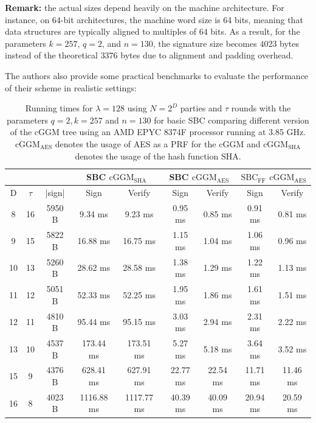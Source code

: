 \documentclass[english]{article}
\begin{document}
		\textbf{Remark:} the actual sizes depend heavily on the machine architecture. For instance, on 64-bit architectures, the machine word size is 64 bits, meaning that data structures are typically aligned to multiples of 64 bits. As a result, for the parameters $k = 257$, $q = 2$, and $n = 130$, the signature size becomes $4023$ bytes instead of the theoretical $3376$ bytes due to alignment and padding overhead.
		
		The authors also provide some practical benchmarks to evaluate the performance of their scheme in realistic settings:
		
		\begin{table}[h!]
			\begin{center}
				\begin{tabular}{|c|c|c||c|c||c|c||c|c|}
					\hline
					\multicolumn{3}{|c||}{} &  \multicolumn{2}{c||}{SBC $\text{cGGM}_{\text{SHA}}$} & \multicolumn{2}{c||}{SBC $\text{cGGM}_{\text{AES}}$} & \multicolumn{2}{c|}{$\text{SBC}_{\text{FF}}$ $\text{cGGM}_{\text{AES}}$} \\
					\hline
					D & $\tau$ & |sign| & Sign & Verify & Sign & Verify & Sign & Verify \\
					\hline
					8 & 16 & 5950 B & 9.34 ms & 9.23 ms & 0.95 ms & 0.85 ms & 0.91 ms & 0.81 ms\\
					\hline
					9 & 15 & 5822 B & 16.88 ms & 16.75 ms & 1.15 ms & 1.04 ms & 1.06 ms & 0.96 ms \\
					\hline
					10 & 13 & 5260 B & 28.62 ms & 28.58 ms & 1.38 ms & 1.29 ms & 1.22 ms & 1.13 ms\\
					\hline
					11 & 12 & 5051 B & 52.33 ms & 52.25 ms & 1.95 ms & 1.86 ms & 1.61 ms & 1.51 ms\\
					\hline
					12 & 11 & 4810 B & 95.44 ms & 95.15 ms & 3.03 ms & 2.94 ms & 2.31 ms & 2.22 ms\\
					\hline
					13 & 10 & 4537 B & 173.44 ms & 173.51 ms & 5.27 ms & 5.18 ms & 3.64 ms & 3.52 ms\\
					\hline
					15 & 9 & 4376 B & 628.41 ms & 627.91 ms & 22.77 ms & 22.54 ms & 11.71 ms & 11.46 ms\\
					\hline
					16 & 8 & 4023 B & 1116.88 ms & 1117.77 ms & 40.39 ms & 40.09 ms & 20.94 ms & 20.59 ms\\
					\hline
				\end{tabular}
				\caption{Running times for $\lambda = 128$ using $N = 2^D$ parties and $\tau$ rounds with the parameters $q = 2, k= 257$ and $n = 130$ for basic SBC comparing different version of the cGGM tree using an AMD EPYC 8374F processor running at 3.85 GHz. $\text{cGGM}_{\text{AES}}$ denotes the usage of AES as a PRF for the cGGM and $\text{cGGM}_{\text{SHA}}$ denotes the usage of the hash function SHA.}
				\label{SBC_sig_times}
			\end{center}
		\end{table}
		
\end{document}
